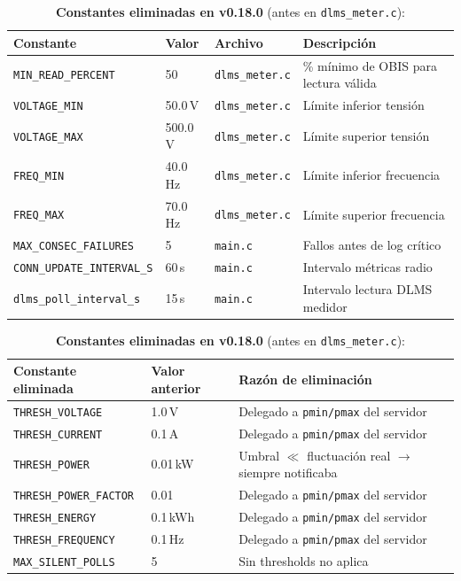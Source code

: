 \begin{table}[htbp]
\centering
\caption{Constantes de configuración del firmware --- v0.18.0}
\label{tab:constants_v018}
\begin{tabular}{@{}llll@{}}
\toprule
\textbf{Constante} & \textbf{Valor} & \textbf{Archivo} & \textbf{Descripción} \\
\midrule
\texttt{MIN\_READ\_PERCENT}       & 50         & \texttt{dlms\_meter.c} & \% mínimo de OBIS para lectura válida \\
\texttt{VOLTAGE\_MIN}             & 50.0\,V    & \texttt{dlms\_meter.c} & Límite inferior tensión \\
\texttt{VOLTAGE\_MAX}             & 500.0\,V   & \texttt{dlms\_meter.c} & Límite superior tensión \\
\texttt{FREQ\_MIN}                & 40.0\,Hz   & \texttt{dlms\_meter.c} & Límite inferior frecuencia \\
\texttt{FREQ\_MAX}                & 70.0\,Hz   & \texttt{dlms\_meter.c} & Límite superior frecuencia \\
\texttt{MAX\_CONSEC\_FAILURES}    & 5          & \texttt{main.c}        & Fallos antes de log crítico \\
\texttt{CONN\_UPDATE\_INTERVAL\_S}& 60\,s      & \texttt{main.c}        & Intervalo métricas radio \\
\texttt{dlms\_poll\_interval\_s}  & 15\,s      & \texttt{main.c}        & Intervalo lectura DLMS medidor \\
\bottomrule
\end{tabular}

\vspace{1em}
\caption*{\textbf{Constantes eliminadas en v0.18.0} (antes en \texttt{dlms\_meter.c}):}
\begin{tabular}{@{}lll@{}}
\toprule
\textbf{Constante eliminada} & \textbf{Valor anterior} & \textbf{Razón de eliminación} \\
\midrule
\texttt{THRESH\_VOLTAGE}       & 1.0\,V   & Delegado a \texttt{pmin/pmax} del servidor \\
\texttt{THRESH\_CURRENT}       & 0.1\,A   & Delegado a \texttt{pmin/pmax} del servidor \\
\texttt{THRESH\_POWER}         & 0.01\,kW & Umbral $\ll$ fluctuación real $\rightarrow$ siempre notificaba \\
\texttt{THRESH\_POWER\_FACTOR} & 0.01     & Delegado a \texttt{pmin/pmax} del servidor \\
\texttt{THRESH\_ENERGY}        & 0.1\,kWh & Delegado a \texttt{pmin/pmax} del servidor \\
\texttt{THRESH\_FREQUENCY}     & 0.1\,Hz  & Delegado a \texttt{pmin/pmax} del servidor \\
\texttt{MAX\_SILENT\_POLLS}    & 5        & Sin thresholds no aplica \\
\bottomrule
\end{tabular}
\end{table}
